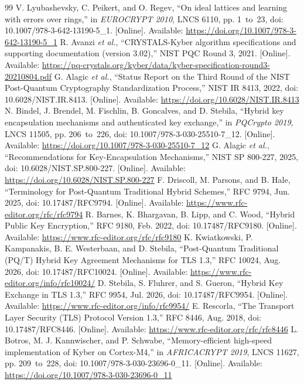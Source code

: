 \documentclass[pdflatex,sn-mathphys-num]{sn-jnl}
\begin{document}
\begin{thebibliography}{99}
 V. Lyubashevsky, C. Peikert, and O. Regev, ``On ideal lattices and learning with errors over rings,'' in \textit{EUROCRYPT 2010}, LNCS 6110, pp. 1~to~23, doi: 10.1007/978-3-642-13190-5\_1. [Online]. Available: \url{https://doi.org/10.1007/978-3-642-13190-5_1}
 R. Avanzi \textit{et al.}, ``CRYSTALS-Kyber algorithm specifications and supporting documentation (version 3.02),'' NIST PQC Round 3, 2021. [Online]. Available: \url{https://pq-crystals.org/kyber/data/kyber-specification-round3-20210804.pdf}
 G. Alagic \textit{et al.}, ``Status Report on the Third Round of the NIST Post-Quantum Cryptography Standardization Process,'' NIST IR 8413, 2022, doi: 10.6028/NIST.IR.8413. [Online]. Available: \url{https://doi.org/10.6028/NIST.IR.8413}
 N. Bindel, J. Brendel, M. Fischlin, B. Goncalves, and D. Stebila, ``Hybrid key encapsulation mechanisms and authenticated key exchange,'' in \textit{PQCrypto 2019}, LNCS 11505, pp. 206~to~226, doi: 10.1007/978-3-030-25510-7\_12. [Online]. Available: \url{https://doi.org/10.1007/978-3-030-25510-7_12}
 G. Alagic \textit{et al.}, ``Recommendations for Key-Encapsulation Mechanisms,'' NIST SP 800-227, 2025, doi: 10.6028/NIST.SP.800-227. [Online]. Available: \url{https://doi.org/10.6028/NIST.SP.800-227}
 F. Driscoll, M. Parsons, and B. Hale, ``Terminology for Post-Quantum Traditional Hybrid Schemes,'' RFC 9794, Jun. 2025, doi: 10.17487/RFC9794. [Online]. Available: \url{https://www.rfc-editor.org/rfc/rfc9794}
 R. Barnes, K. Bhargavan, B. Lipp, and C. Wood, ``Hybrid Public Key Encryption,'' RFC 9180, Feb. 2022, doi: 10.17487/RFC9180. [Online]. Available: \url{https://www.rfc-editor.org/rfc/rfc9180}
 K. Kwiatkowski, P. Kampanakis, B. E. Westerbaan, and D. Stebila, ``Post-Quantum Traditional (PQ/T) Hybrid Key Agreement Mechanisms for TLS 1.3,'' RFC 10024, Aug. 2026, doi: 10.17487/RFC10024. [Online]. Available: \url{https://www.rfc-editor.org/info/rfc10024/}
 D. Stebila, S. Fluhrer, and S. Gueron, ``Hybrid Key Exchange in TLS 1.3,'' RFC 9954, Jul. 2026, doi: 10.17487/RFC9954. [Online]. Available: \url{https://www.rfc-editor.org/info/rfc9954/}
 E. Rescorla, ``The Transport Layer Security (TLS) Protocol Version 1.3,'' RFC 8446, Aug. 2018, doi: 10.17487/RFC8446. [Online]. Available: \url{https://www.rfc-editor.org/rfc/rfc8446}
 L. Botros, M. J. Kannwischer, and P. Schwabe, ``Memory-efficient high-speed implementation of Kyber on Cortex-M4,'' in \textit{AFRICACRYPT 2019}, LNCS 11627, pp. 209~to~228, doi: 10.1007/978-3-030-23696-0\_11. [Online]. Available: \url{https://doi.org/10.1007/978-3-030-23696-0_11}

\end{thebibliography}
\end{document}
